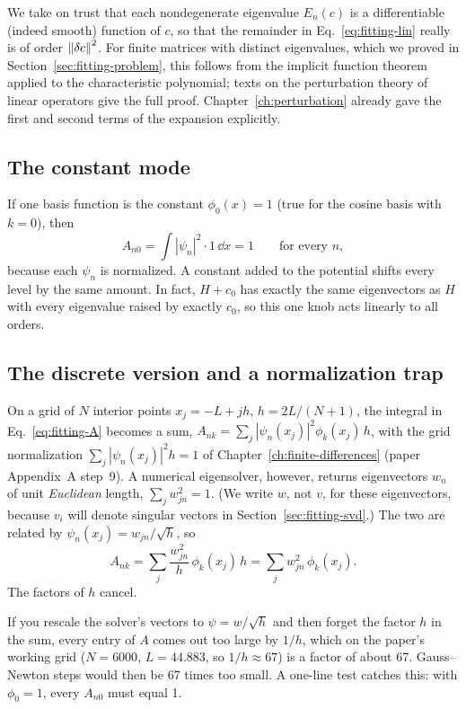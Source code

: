 \begin{beyond}
We take on trust that each nondegenerate eigenvalue $E_n(c)$ is a differentiable (indeed smooth) function of $c$, so that the remainder in Eq.~\eqref{eq:fitting-lin} really is of order $\left\lVert \delta c\right\rVert^2$. For finite matrices with distinct eigenvalues, which we proved in Section~\ref{sec:fitting-problem}, this follows from the implicit function theorem applied to the characteristic polynomial; texts on the perturbation theory of linear operators give the full proof. Chapter~\ref{ch:perturbation} already gave the first and second terms of the expansion explicitly.
\end{beyond}

\subsection{The constant mode}

If one basis function is the constant $\phi_0(x)=1$ (true for the cosine basis with $k=0$), then
\[
A_{n0}=\int|\psi_n|^2\cdot1\,\dd x=1\qquad\text{for every }n,
\]
because each $\psi_n$ is normalized. A constant added to the potential shifts every level by the same amount. In fact, $H+c_0$ has exactly the same eigenvectors as $H$ with every eigenvalue raised by exactly $c_0$, so this one knob acts linearly to all orders.

\subsection{The discrete version and a normalization trap}

On a grid of $N$ interior points $x_j=-L+jh$, $h=2L/(N+1)$, the integral in Eq.~\eqref{eq:fitting-A} becomes a sum, $A_{nk}=\sum_j|\psi_n(x_j)|^2\phi_k(x_j)\,h$, with the grid normalization $\sum_j|\psi_n(x_j)|^2h=1$ of Chapter~\ref{ch:finite-differences} (paper Appendix~A step~9). A numerical eigensolver, however, returns eigenvectors $w_n$ of unit \emph{Euclidean} length, $\sum_jw_{jn}^2=1$. (We write $w$, not $v$, for these eigenvectors, because $v_i$ will denote singular vectors in Section~\ref{sec:fitting-svd}.) The two are related by $\psi_n(x_j)=w_{jn}/\sqrt h$, so
\begin{equation}
A_{nk}=\sum_j\frac{w_{jn}^2}{h}\,\phi_k(x_j)\,h=\sum_jw_{jn}^2\,\phi_k(x_j).
\label{eq:fitting-Adisc}
\end{equation}
The factors of $h$ cancel.

\begin{pitfall}
If you rescale the solver's vectors to $\psi=w/\sqrt h$ and then forget the factor $h$ in the sum, every entry of $A$ comes out too large by $1/h$, which on the paper's working grid ($N=6000$, $L=44.883$, so $1/h\approx67$) is a factor of about 67. Gauss--Newton steps would then be 67 times too small. A one-line test catches this: with $\phi_0=1$, every $A_{n0}$ must equal 1.
\end{pitfall}

